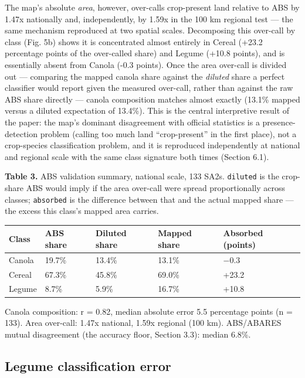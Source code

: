 The map's absolute \emph{area}, however, over-calls crop-present land relative to ABS by 1.47x nationally and, independently, by 1.59x in the 100 km regional test --- the same mechanism reproduced at two spatial scales. Decomposing this over-call by class (Fig. 5b) shows it is concentrated almost entirely in Cereal (+23.2 percentage points of the over-called share) and Legume (+10.8 points), and is essentially absent from Canola (-0.3 points). Once the area over-call is divided out --- comparing the mapped canola share against the \emph{diluted} share a perfect classifier would report given the measured over-call, rather than against the raw ABS share directly --- canola composition matches almost exactly (13.1\% mapped versus a diluted expectation of 13.4\%). This is the central interpretive result of the paper: the map's dominant disagreement with official statistics is a presence-detection problem (calling too much land ``crop-present'' in the first place), not a crop-species classification problem, and it is reproduced independently at national and regional scale with the same class signature both times (Section 6.1).

\textbf{Table 3.} ABS validation summary, national scale, 133 SA2s. \texttt{diluted} is the crop-share ABS would imply if the area over-call were spread proportionally across classes; \texttt{absorbed} is the difference between that and the actual mapped share --- the excess this class's mapped area carries.

\begin{longtable}[]{@{}lllll@{}}
\toprule\noalign{}
Class & ABS share & Diluted share & Mapped share & Absorbed (points) \\
\midrule\noalign{}
\endhead
\bottomrule\noalign{}
\endlastfoot
Canola & 19.7\% & 13.4\% & 13.1\% & $-$0.3 \\
Cereal & 67.3\% & 45.8\% & 69.0\% & +23.2 \\
Legume & 8.7\% & 5.9\% & 16.7\% & +10.8 \\
\end{longtable}


Canola composition: r = 0.82, median absolute error 5.5 percentage points (n = 133). Area over-call: 1.47x national, 1.59x regional (100 km). ABS/ABARES mutual disagreement (the accuracy floor, Section 3.3): median 6.8\%.

\subsection{Legume classification error}\label{legume-classification-error}

